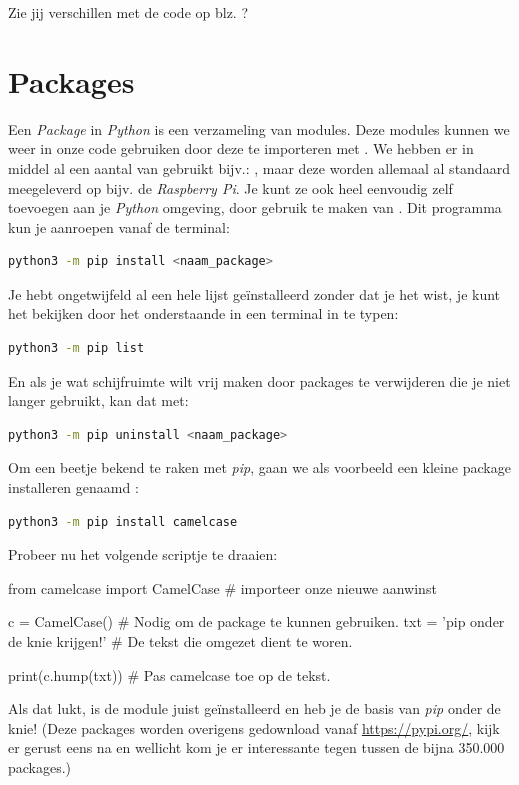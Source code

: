 \begin{exercise}
Zie jij verschillen met de code op blz. \pageref{sec:piledobj}?
\end{exercise}

\newpage

\section{Packages}
Een \textit{Package} in \textit{Python} is een verzameling van modules. Deze modules kunnen we weer in onze code gebruiken door deze te importeren met . We hebben er in middel al een aantal van gebruikt bijv.: , maar deze worden allemaal al standaard meegeleverd op bijv. de \textit{Raspberry Pi}. Je kunt ze ook heel eenvoudig zelf toevoegen aan je \textit{Python} omgeving, door gebruik te maken van . Dit programma kun je aanroepen vanaf de terminal:

\begin{lstlisting}[language=bash]
python3 -m pip install <naam_package>
\end{lstlisting}

\begin{remark}
Je hebt ongetwijfeld al een hele lijst geïnstalleerd zonder dat je het wist, je kunt het bekijken door het onderstaande in een terminal in te typen: 
\begin{lstlisting}[language=bash]
python3 -m pip list
\end{lstlisting}
En als je wat schijfruimte wilt vrij maken door packages te verwijderen die je niet langer gebruikt, kan dat met:
\begin{lstlisting}[language=bash]
python3 -m pip uninstall <naam_package>
\end{lstlisting}
\end{remark}

Om een beetje bekend te raken met \textit{pip}, gaan we als voorbeeld een kleine package installeren genaamd :
\begin{lstlisting}[language=bash]
python3 -m pip install camelcase
\end{lstlisting}

Probeer nu het volgende scriptje te draaien:
\begin{python}
from camelcase import CamelCase     # importeer onze nieuwe aanwinst

c = CamelCase()                     # Nodig om de package te kunnen gebruiken.
txt = 'pip onder de knie krijgen!'  # De tekst die omgezet dient te woren.

print(c.hump(txt))                  # Pas camelcase toe op de tekst.
\end{python}
Als dat lukt, is de module juist geïnstalleerd en heb je de basis van \textit{pip} onder de knie! (Deze packages worden overigens gedownload vanaf \url{https://pypi.org/}, kijk er gerust eens na en wellicht kom je er interessante tegen tussen de bijna 350.000 packages.) 

